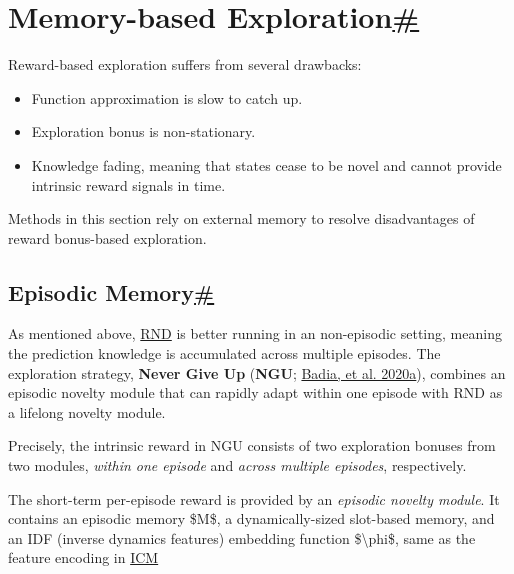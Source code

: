 \section{\texorpdfstring{Memory-based Exploration\hyperref[memory-based-exploration]{\#}}{Memory-based Exploration\#}}\label{memory-based-exploration}

Reward-based exploration suffers from several drawbacks:

\begin{itemize}
\tightlist
\item
  Function approximation is slow to catch up.
\item
  Exploration bonus is non-stationary.
\item
  Knowledge fading, meaning that states cease to be novel and cannot provide intrinsic reward signals in time.
\end{itemize}

Methods in this section rely on external memory to resolve disadvantages of reward bonus-based exploration.

\subsection{\texorpdfstring{Episodic Memory\hyperref[episodic-memory]{\#}}{Episodic Memory\#}}\label{episodic-memory}

As mentioned above, \hyperref[RND]{RND} is better running in an non-episodic setting, meaning the prediction knowledge is accumulated across multiple episodes. The exploration strategy, \textbf{Never Give Up} (\textbf{NGU}; \href{https://arxiv.org/abs/2002.06038}{Badia, et al. 2020a}), combines an episodic novelty module that can rapidly adapt within one episode with RND as a lifelong novelty module.

Precisely, the intrinsic reward in NGU consists of two exploration bonuses from two modules, \emph{within one episode} and \emph{across multiple episodes}, respectively.

The short-term per-episode reward is provided by an \emph{episodic novelty module}. It contains an episodic memory \$M\$, a dynamically-sized slot-based memory, and an IDF (inverse dynamics features) embedding function \$\textbackslash phi\$, same as the feature encoding in \hyperref[ICM]{ICM}

